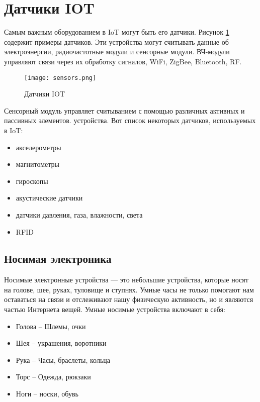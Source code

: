\section{Датчики IOT}
Самым важным оборудованием в IoT могут быть его датчики. Рисунок \ref{fig:section4:sensors} содержит примеры датчиков. Эти устройства могут считывать данные об электроэнергии, радиочастотные модули и сенсорные модули. ВЧ-модули управляют связи через их обработку сигналов, WiFi, ZigBee, Bluetooth, RF.

\begin{figure}[h!]
    \centering
    \texttt{[image: sensors.png]}
    \caption{Датчики IOT}
    \label{fig:section4:sensors}
\end{figure}

Сенсорный модуль управляет считыванием с помощью различных активных и пассивных элементов.
устройства. Вот список некоторых датчиков, используемых в IoT:
\begin{itemize}
    \item акселерометры
    \item магнитометры
    \item гироскопы
    \item акустические датчики
    \item датчики давления, газа, влажности, света
    \item RFID
\end{itemize}

\subsection{Носимая электроника}
Носимые электронные устройства — это небольшие устройства, которые носят на голове, шее, руках, туловище и ступнях.
Умные часы не только помогают нам оставаться на связи и отслеживают нашу физическую активность, но и являются частью Интернета вещей.\cite{IoTArch}
Умные носимые устройства включают в себя:
\begin{itemize}
    \item Голова – Шлемы, очки
    \item Шея – украшения, воротники
    \item Рука – Часы, браслеты, кольца
    \item Торс – Одежда, рюкзаки
    \item Ноги – носки, обувь
\end{itemize}

